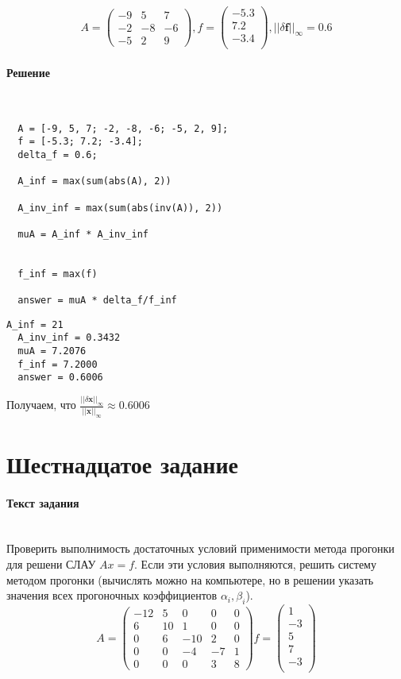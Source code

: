 \[
  A =
  \begin{pmatrix}
    -9 & 5 & 7\\
    -2 & -8& -6\\
    -5 & 2 & 9
  \end{pmatrix}
  , f =
  \begin{pmatrix}
    -5.3\\
    7.2\\
    -3.4\\
  \end{pmatrix}
  , ||\delta \textbf{f}||_{\infty} = 0.6
\]

\paragraph{Решение} ~\\
\begin{lstlisting}
  A = [-9, 5, 7; -2, -8, -6; -5, 2, 9];
  f = [-5.3; 7.2; -3.4];
  delta_f = 0.6;

  A_inf = max(sum(abs(A), 2))

  A_inv_inf = max(sum(abs(inv(A)), 2))

  muA = A_inf * A_inv_inf


  f_inf = max(f)

  answer = muA * delta_f/f_inf
\end{lstlisting}
\begin{lstlisting}[backgroundcolor=\color{cyan}]
  A_inf = 21
  A_inv_inf = 0.3432
  muA = 7.2076
  f_inf = 7.2000
  answer = 0.6006
\end{lstlisting}
Получаем, что $\frac{||\delta \textbf{x}||_{\infty}}{||\textbf{x}||_{\infty}} \approx 0.6006$

\section{Шестнадцатое задание}
\paragraph{Текст задания} ~\\
Проверить выполнимость достаточных условий применимости метода прогонки для решени СЛАУ $Ax = f$. Если эти условия выполняются, решить систему методом прогонки (вычислять можно на компьютере, но в решении указать значения всех прогоночных коэффициентов $\alpha_{i}, \beta_{i}$).
\[
  A =
  \begin{pmatrix}
    -12 & 5  &  0  & 0 & 0 \\
    6   & 10 &  1  & 0 & 0 \\
    0   & 6  & -10 & 2 & 0 \\
    0   & 0  & -4  & -7 & 1 \\
    0   & 0  &  0  & 3 & 8
  \end{pmatrix}
  f =
  \begin{pmatrix}
    1  \\
    -3 \\
    5  \\
    7  \\
    -3 \\
  \end{pmatrix}
\]

